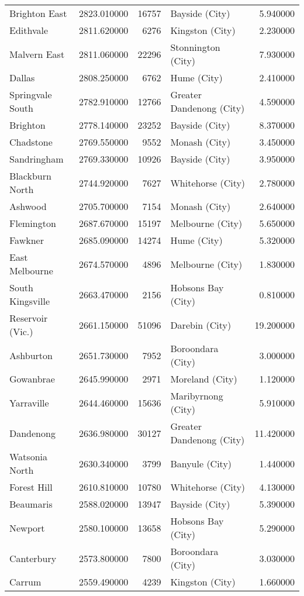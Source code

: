 \begin{longtable}{lrrlr}
Brighton East & 2823.010000 & 16757 & Bayside (City) & 5.940000 \\
Edithvale & 2811.620000 & 6276 & Kingston (City) & 2.230000 \\
Malvern East & 2811.060000 & 22296 & Stonnington (City) & 7.930000 \\
Dallas & 2808.250000 & 6762 & Hume (City) & 2.410000 \\
Springvale South & 2782.910000 & 12766 & Greater Dandenong (City) & 4.590000 \\
Brighton & 2778.140000 & 23252 & Bayside (City) & 8.370000 \\
Chadstone & 2769.550000 & 9552 & Monash (City) & 3.450000 \\
Sandringham & 2769.330000 & 10926 & Bayside (City) & 3.950000 \\
Blackburn North & 2744.920000 & 7627 & Whitehorse (City) & 2.780000 \\
Ashwood & 2705.700000 & 7154 & Monash (City) & 2.640000 \\
Flemington & 2687.670000 & 15197 & Melbourne (City) & 5.650000 \\
Fawkner & 2685.090000 & 14274 & Hume (City) & 5.320000 \\
East Melbourne & 2674.570000 & 4896 & Melbourne (City) & 1.830000 \\
South Kingsville & 2663.470000 & 2156 & Hobsons Bay (City) & 0.810000 \\
Reservoir (Vic.) & 2661.150000 & 51096 & Darebin (City) & 19.200000 \\
Ashburton & 2651.730000 & 7952 & Boroondara (City) & 3.000000 \\
Gowanbrae & 2645.990000 & 2971 & Moreland (City) & 1.120000 \\
Yarraville & 2644.460000 & 15636 & Maribyrnong (City) & 5.910000 \\
Dandenong & 2636.980000 & 30127 & Greater Dandenong (City) & 11.420000 \\
Watsonia North & 2630.340000 & 3799 & Banyule (City) & 1.440000 \\
Forest Hill & 2610.810000 & 10780 & Whitehorse (City) & 4.130000 \\
Beaumaris & 2588.020000 & 13947 & Bayside (City) & 5.390000 \\
Newport & 2580.100000 & 13658 & Hobsons Bay (City) & 5.290000 \\
Canterbury & 2573.800000 & 7800 & Boroondara (City) & 3.030000 \\
Carrum & 2559.490000 & 4239 & Kingston (City) & 1.660000 \\

\end{longtable}
